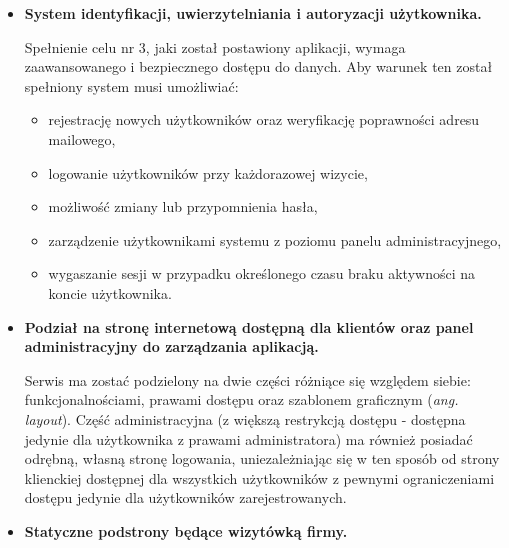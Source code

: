 \begin{itemize}
    \item \textbf{System identyfikacji, uwierzytelniania i autoryzacji
    użytkownika.}
    
    Spełnienie celu nr 3, jaki został postawiony aplikacji, wymaga zaawansowanego i bezpiecznego dostępu do danych. Aby warunek ten został spełniony system musi umożliwiać:
    \begin{itemize}
        \item rejestrację nowych użytkowników oraz weryfikację poprawności adresu mailowego,
        \item logowanie użytkowników przy każdorazowej wizycie,
        \item możliwość zmiany lub przypomnienia hasła,
        \item zarządzenie użytkownikami systemu z poziomu panelu administracyjnego,
        \item wygaszanie sesji w przypadku określonego czasu braku aktywności na koncie użytkownika.
    \end{itemize}

    \item \textbf{Podział na stronę internetową dostępną dla klientów oraz panel administracyjny do zarządzania aplikacją.}
    
    Serwis ma zostać podzielony na dwie części różniące się względem siebie: funkcjonalnościami, prawami dostępu oraz szablonem graficznym (\textit{ang. layout}). Część administracyjna (z większą restrykcją dostępu - dostępna jedynie dla użytkownika z prawami administratora) ma również posiadać odrębną, własną stronę logowania, uniezależniając się w ten sposób od strony klienckiej dostępnej dla wszystkich użytkowników z pewnymi ograniczeniami dostępu jedynie dla użytkowników zarejestrowanych.
    
    \item \textbf{Statyczne podstrony będące wizytówką firmy.}
    

\end{itemize}
